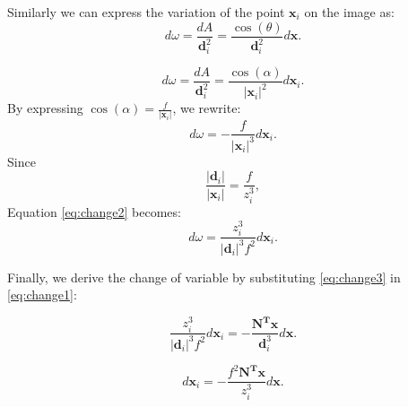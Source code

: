 Similarly we can express the variation of the point $\mathbf{x}_i$ on the image as: 
\begin{equation}
    d\omega = \frac{dA}{\mathbf{d}_i^2} = \frac{\cos(\theta)}{\mathbf{d}_i^2}d\mathbf{x}.
\end{equation}

\begin{equation}
\label{eq:change2}
    d\omega = \frac{dA}{\mathbf{d}_i^2} = \frac{\cos(\alpha)}{|\mathbf{x}_i|^2}d\mathbf{x}_i.
\end{equation}
By expressing $\cos(\alpha) = \frac{f}{|\mathbf{x}_i|}$,  we rewrite:
\begin{equation}
    d\omega  = -\frac{f}{|\mathbf{x}_i|^3}d\mathbf{x}_i.
\end{equation}
Since
\begin{equation}
 \frac{|\mathbf{d}_i|}{|\mathbf{x}_i|} = \frac{f}{z_i^3},
\end{equation}
Equation \eqref{eq:change2} becomes:
\begin{equation}
\label{eq:change3}
    d\omega  = \frac{z_i^3}{|\mathbf{d}_i|^3 f^2}d\mathbf{x}_i.
\end{equation}

Finally, we derive the change of variable by substituting \eqref{eq:change3} in  \eqref{eq:change1}:


\begin{equation}
\label{eq:change4}
    \frac{z_i^3}{|\mathbf{d}_i|^3 f^2}d\mathbf{x}_i = -\frac{\mathbf{N^T x}}{\mathbf{d}_i^3}d\mathbf{x}.
\end{equation}

\begin{equation}
\label{eq:change5}
    d\mathbf{x}_i = -\frac{f^2 \mathbf{N^T x}}{z_i^3}d\mathbf{x}.
\end{equation}




